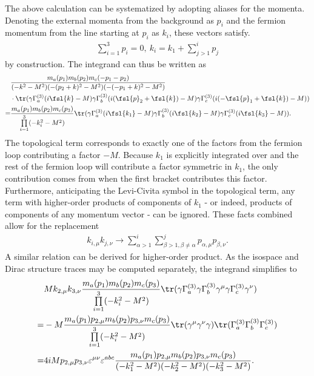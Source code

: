 The above calculation can be systematized by adopting aliases for the momenta. Denoting the external momenta from the background as $p_{i}$ and the fermion momentum from the line starting at $p_{i}$ as $k_{i}$, these vectors satisfy.
\begin{align*}
\sum\limits_{i = 1}^{3}p_{i} = 0,\ k_{i} = k_{1} + \sum\limits_{j > 1}^{i}p_{j}
\end{align*}
by construction. The integrand can thus be written as
\begin{align*}
&\frac{m_{a}(p_{1})m_{b}(p_{2})m_{c}(-p_{1} - p_{2})}{(-k^{2} - M^{2})(-(p_{2} + k)^{2} - M^{2})(-(-p_{1} + k)^{2} - M^{2})} \\
&\cdot\tr(\gamma\Gamma_{a}^{(3)}(i\fsl{k} - M)\gamma\Gamma_{b}^{(3)}(i(\fsl{p}_{2} + \fsl{k}) - M)\gamma\Gamma_{c}^{(3)}(i(-\fsl{p}_{1} + \fsl{k}) - M)) \\
=& \frac{m_{a}(p_{1})m_{b}(p_{2})m_{c}(p_{3})}{\prod\limits_{i = 1}^{3}(-k_{i}^{2} - M^{2})}\tr(\gamma\Gamma_{a}^{(3)}(i\fsl{k_{1}} - M)\gamma\Gamma_{b}^{(3)}(i\fsl{k_{2}} - M)\gamma\Gamma_{c}^{(3)}(i\fsl{k_{3}} - M)).
\end{align*}
The topological term corresponds to exactly one of the factors from the fermion loop contributing a factor $-M$. Because $k_{1}$ is explicitly integrated over and the rest of the fermion loop will contribute a factor symmetric in $k_{1}$, the only contribution comes from when the first bracket contributes this factor. Furthermore, anticipating the Levi-Civita symbol in the topological term, any term with higher-order products of components of $k_{1}$ - or indeed, products of components of any momentum vector - can be ignored. These facts combined allow for the replacement
\begin{align*}
k_{i, \mu}k_{j, \nu} \to \sum\limits_{\alpha > 1}^{i}\sum\limits_{\beta > 1, \beta \neq \alpha}^{j}p_{\alpha, \mu}p_{\beta, \nu}.
\end{align*}
A similar relation can be derived for higher-order product. As the isospace and Dirac structure traces may be computed separately, the integrand simplifies to
\begin{align*}
&Mk_{2, \mu}k_{3, \nu}\frac{m_{a}(p_{1})m_{b}(p_{2})m_{c}(p_{3})}{\prod\limits_{i = 1}^{3}(-k_{i}^{2} - M^{2})}\tr(\gamma\Gamma_{a}^{(3)}\gamma\Gamma_{b}^{(3)}\gamma^{\mu}\gamma\Gamma_{c}^{(3)}\gamma^{\nu}) \\
=& -M\frac{m_{a}(p_{1})p_{2, \mu}m_{b}(p_{2})p_{3, \nu}m_{c}(p_{3})}{\prod\limits_{i = 1}^{3}(-k_{i}^{2} - M^{2})}\tr(\gamma^{\mu}\gamma^{\nu}\gamma)\tr(\Gamma_{a}^{(3)}\Gamma_{b}^{(3)}\Gamma_{c}^{(3)}) \\
=& 4iMp_{2, \mu}p_{3, \nu}\varepsilon^{\mu\nu}\varepsilon^{abc}\frac{m_{a}(p_{1})p_{2, \mu}m_{b}(p_{2})p_{3, \nu}m_{c}(p_{3})}{(-k_{1}^{2} - M^{2})(-k_{2}^{2} - M^{2})(-k_{3}^{2} - M^{2})}.
\end{align*}
